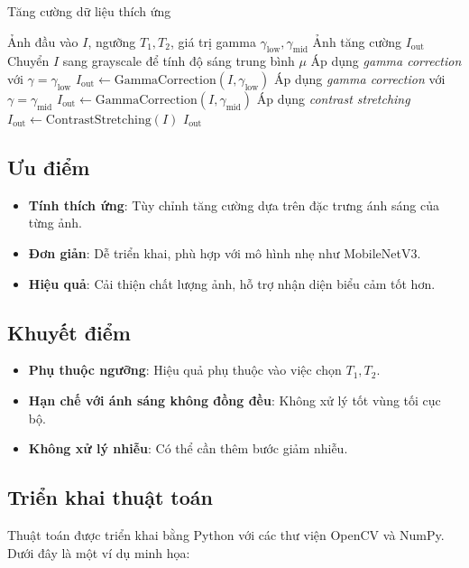 \documentclass[a4paper,12pt]{article}
\begin{document}
\begin{algorithm}
\caption{Tăng cường dữ liệu thích ứng}
\begin{algorithmic}[1]
\Require Ảnh đầu vào \( I \), ngưỡng \( T_1, T_2 \), giá trị gamma \( \gamma_{\text{low}}, \gamma_{\text{mid}} \)
\Ensure Ảnh tăng cường \( I_{\text{out}} \)
\State Chuyển \( I \) sang grayscale để tính độ sáng trung bình \( \mu \)
    \State Áp dụng \textit{gamma correction} với \( \gamma = \gamma_{\text{low}} \)
    \State \( I_{\text{out}} \gets \text{GammaCorrection}(I, \gamma_{\text{low}}) \)
    \State Áp dụng \textit{gamma correction} với \( \gamma = \gamma_{\text{mid}} \)
    \State \( I_{\text{out}} \gets \text{GammaCorrection}(I, \gamma_{\text{mid}}) \)
\Else
    \State Áp dụng \textit{contrast stretching}
    \State \( I_{\text{out}} \gets \text{ContrastStretching}(I) \)
\EndIf
\State \Return \( I_{\text{out}} \)
\end{algorithmic}
\end{algorithm}

\subsection{Ưu điểm}
\begin{itemize}
    \item \textbf{Tính thích ứng}: Tùy chỉnh tăng cường dựa trên đặc trưng ánh sáng của từng ảnh.
    \item \textbf{Đơn giản}: Dễ triển khai, phù hợp với mô hình nhẹ như MobileNetV3.
    \item \textbf{Hiệu quả}: Cải thiện chất lượng ảnh, hỗ trợ nhận diện biểu cảm tốt hơn.
\end{itemize}

\subsection{Khuyết điểm}
\begin{itemize}
    \item \textbf{Phụ thuộc ngưỡng}: Hiệu quả phụ thuộc vào việc chọn \( T_1, T_2 \).
    \item \textbf{Hạn chế với ánh sáng không đồng đều}: Không xử lý tốt vùng tối cục bộ.
    \item \textbf{Không xử lý nhiễu}: Có thể cần thêm bước giảm nhiễu.
\end{itemize}

\subsection{Triển khai thuật toán}
Thuật toán được triển khai bằng Python với các thư viện OpenCV và NumPy. Dưới đây là một ví dụ minh họa:
\end{document}
